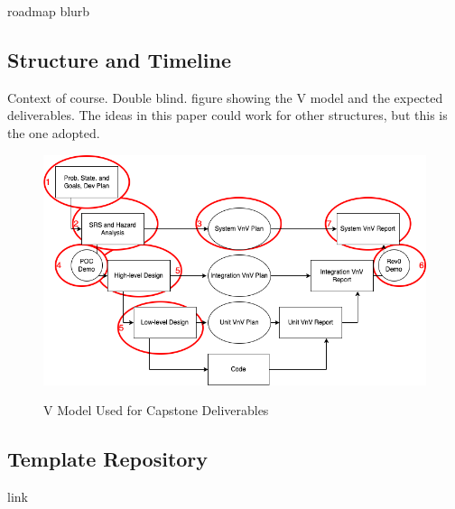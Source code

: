 \documentclass[10pt, conference]{IEEEtran}
\begin{document}
roadmap blurb

\subsection{Structure and Timeline}

Context of course. Double blind. figure showing the V model and the expected
deliverables.  The ideas in this paper could work for other structures, but this
is the one adopted.

\begin{figure}[h!]
  \begin{center}
    {
      \includegraphics[width=0.75\columnwidth]{./figures/VModelOfProcessDeliverables.png}
    }
    \caption{\label{Fig_VModel} V Model Used for Capstone Deliverables}
  \end{center}
\end{figure}
\subsection{Template Repository}

link
\end{document}
